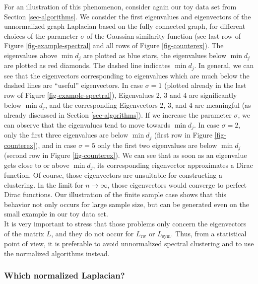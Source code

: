\documentclass{article}
\newcommand{\Lun}{L}
\newcommand{\Lsym}{L_{\text{sym}}}
\newcommand{\Lrw}{L_{\text{rw}}}
\begin{document}
%
For an illustration of this phenomenon, consider again our toy data set
from Section \ref{sec-algorithms}.  We consider the first eigenvalues
and eigenvectors of the unnormalized graph Laplacian based on the
fully connected graph, for different choices of the parameter $\sigma$
of the Gaussian similarity function (see last row of Figure
\ref{fig-example-spectral} and all rows of Figure \ref{fig-counterex}).  The
eigenvalues above $\min d_j$ are plotted as blue stars, the
eigenvalues below $\min d_j$ are plotted as red diamonds.  The dashed
line indicates $\min d_j$.
%
In general, we can see that the eigenvectors corresponding to
eigenvalues which are much below the dashed lines are ``useful''
eigenvectors.  In case $\sigma=1$ (plotted already in the last row of
Figure \ref{fig-example-spectral}), Eigenvalues 2, 3 and 4 are
significantly below $\min d_j$, and the corresponding Eigenvectors 2,
3, and 4 are meaningful (as already discussed in Section
\ref{sec-algorithms}).  If we increase the parameter $\sigma$, we can
observe that the eigenvalues tend to move towards $\min d_j$. In case
$\sigma=2$, only the first three eigenvalues are below $\min d_j$
(first row in Figure \ref{fig-counterex}), and in case $\sigma=5$ only
the first two eigenvalues are below $\min d_j$ (second row in Figure
\ref{fig-counterex}). We can see that as soon as an eigenvalue gets
close to or above $\min d_j$, its corresponding eigenvector
approximates a Dirac function. Of course, those eigenvectors are
unsuitable for constructing a clustering. In the limit for $n \to
\infty$, those eigenvectors would converge to perfect Dirac
functions. Our illustration of the finite sample case shows that this
behavior not only occurs for large sample size, but can be generated
even on the small example in our toy data set.\\

It is very important to stress that those problems only concern the
eigenvectors of the matrix $\Lun$, and they do not occur for $\Lrw$ or
$\Lsym$. Thus, from a statistical point of view, it is preferable to
avoid unnormalized spectral clustering and to use the normalized
algorithms instead.\\





\subsubsection*{Which normalized Laplacian?}
\end{document}
